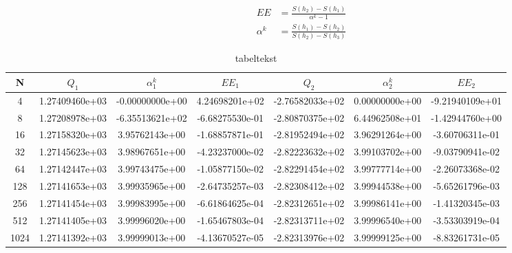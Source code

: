 \begin{equation}
\begin{align*}
EE&=\frac { S\left( h_{ 2 } \right) -S\left( h_{ 1 } \right)  }{ \alpha ^{ k }-1 } \\ 
\alpha ^{ k }&=\frac { S\left( h_{ 1 } \right) -S\left( h_{ 2 } \right)  }{ S\left( h_{ 2 } \right) -S\left( h_{ 3 } \right)  } 
\end{align*}
\label{eq:Q12}
\end{equation}



\begin{table}[th!]
\centering
\begin{tabular}{c|c|c|c|c|c|c}
 N &  \( Q_1 \) & \( { \alpha }_{  1}^{ k } \) & \(  EE_1 \) & \( Q_2 \) & \(  { \alpha }_{  2}^{ k } \) & \( EE_2 \)  \\\hline
4&1.27409460e+03&-0.00000000e+00&4.24698201e+02&-2.76582033e+02&0.00000000e+00&-9.21940109e+01\\
8&1.27208978e+03&-6.35513621e+02&-6.68275530e-01&-2.80870375e+02&6.44962508e+01&-1.42944760e+00\\
16&1.27158320e+03&3.95762143e+00&-1.68857871e-01&-2.81952494e+02&3.96291264e+00&-3.60706311e-01\\
32&1.27145623e+03&3.98967651e+00&-4.23237000e-02&-2.82223632e+02&3.99103702e+00&-9.03790941e-02\\
64&1.27142447e+03&3.99743475e+00&-1.05877150e-02&-2.82291454e+02&3.99777714e+00&-2.26073368e-02\\
128&1.27141653e+03&3.99935965e+00&-2.64735257e-03&-2.82308412e+02&3.99944538e+00&-5.65261796e-03\\
256&1.27141454e+03&3.99983995e+00&-6.61864625e-04&-2.82312651e+02&3.99986141e+00&-1.41320345e-03 \\
512&1.27141405e+03&3.99996020e+00&-1.65467803e-04&-2.82313711e+02&3.99996540e+00&-3.53303919e-04 \\
1024&1.27141392e+03&3.99999013e+00&-4.13670527e-05&-2.82313976e+02&3.99999125e+00&-8.83261731e-05 \\
\end{tabular}
\caption[tekst i indholdsfortegnelsen]{tabeltekst}
\label{tb:resultater}
\end{table}

